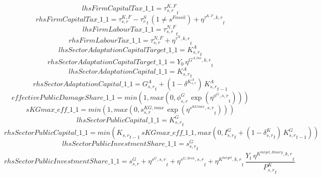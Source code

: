 \begin{dmath*}
lhsFirmCapitalTax\_1\_1 = {{\tau^{K,F}_{s,r}}}_{t}
\end{dmath*}
\begin{dmath*}
rhsFirmCapitalTax\_1\_1 = {{\tau^{K,F}_{s,r}}}-{{\tau^{S}_{r}}}_{t}\, \left(1\neq {{s^{Fossil}}}\right)+{{\eta^{\tau^{K,F},k,r}}}_{t}
\end{dmath*}
\begin{dmath*}
lhsFirmLabourTax\_1\_1 = {{\tau^{N,F}_{s,r}}}_{t}
\end{dmath*}
\begin{dmath*}
rhsFirmLabourTax\_1\_1 = {{\tau^{N,F}_{s,r}}}+{{\eta^{\tau^{N},k,r}}}_{t}
\end{dmath*}
\begin{dmath*}
lhsSectorAdaptationCapitalTarget\_1\_1 = {{K^{A}_{s,r}}}_{t}
\end{dmath*}
\begin{dmath*}
rhsSectorAdaptationCapitalTarget\_1\_1 = {{Y_0}}\, {{\eta^{G^{A,tas},k,r}}}_{t}
\end{dmath*}
\begin{dmath*}
lhsSectorAdaptationCapital\_1\_1 = {{K^{A}_{s,r}}}_{t}
\end{dmath*}
\begin{dmath*}
rhsSectorAdaptationCapital\_1\_1 = {{G^{A}_{s,r}}}_{t}+\left(1-{{\delta^{K^{A}_{s,r}}}}\right)\, {{K^{A}_{s,r}}}_{t-1}
\end{dmath*}
\begin{dmath*}
effectivePublicDamageShare\_1\_1 = min(1,max(0,{{\phi^{G}_{s,r}}}\, \exp\left({{\eta^{\phi^{G},s,r}}}_{t}\right)))
\end{dmath*}
\begin{dmath*}
sKGmax\_eff\_1\_1 = min(1,max(0,{{s^{KG,max}_{s,r}}}\, \exp\left({{\eta^{s^{KGmax},s,r}}}_{t}\right)))
\end{dmath*}
\begin{dmath*}
lhsSectorPublicCapital\_1\_1 = {{K^G_{s,r}}}_{t}
\end{dmath*}
\begin{dmath*}
rhsSectorPublicCapital\_1\_1 = min({{K_{s,r}}}_{t-1}\, {sKGmax\_eff\_1\_1},max(0,{{I^G_{s,r}}}_{t}+\left(1-{{\delta^{K}_{s,r}}}_{t}\right)\, {{K^G_{s,r}}}_{t-1}))
\end{dmath*}
\begin{dmath*}
lhsSectorPublicInvestmentShare\_1\_1 = {{s^G_{s,r}}}_{t}
\end{dmath*}
\begin{dmath*}
rhsSectorPublicInvestmentShare\_1\_1 = {{s^{G}_{s,r}}}+{{\eta^{s^G,s,r}}}_{t}+{{\eta^{s^{G,Scen},s,r}}}_{t}+{{\eta^{K^{target},k,r}}}_{t}\, \frac{{Y}_{t}\, {{\eta^{K^{target,Binary},k,r}}}_{t}}{{{P^K_{s,r}}}_{t}}
\end{dmath*}
